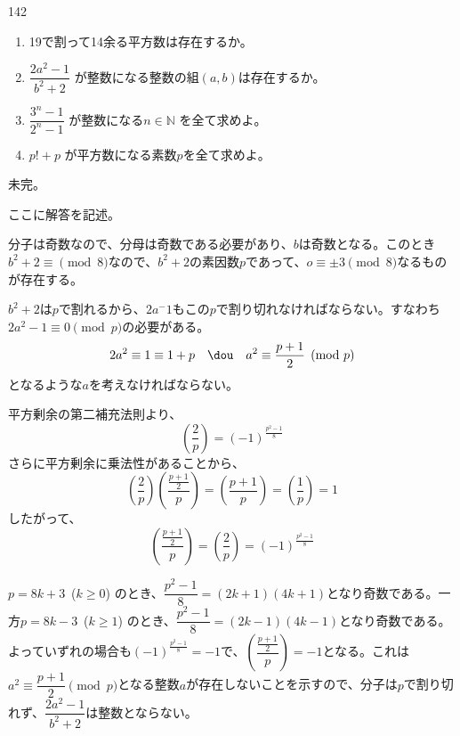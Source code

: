 \begin{thm}{142}{}{}
 \begin{enumerate}
  \item 19で割って14余る平方数は存在するか。 
  \item $\dfrac{2a^2-1}{b^2+2}$ が整数になる整数の組$(a,b)$は存在するか。 
  \item $\dfrac{3^n-1}{2^n-1}$ が整数になる$n\in\mathbb{N}$ を全て求めよ。 
  \item $p!+p$ が平方数になる素数$p$を全て求めよ。 
 \end{enumerate}
\end{thm}

未完。

ここに解答を記述。

分子は奇数なので、分母は奇数である必要があり、$b$は奇数となる。このとき$b^2+2\equiv\pmod{8}$なので、$b^2+2$の素因数$p$であって、$o\equiv\pm 3 \pmod{8}$なるものが存在する。

$b^2+2$は$p$で割れるから、$2a^-1$もこの$p$で割り切れなければならない。すなわち$2a^2-1\equiv 0\pmod{p}$の必要がある。
\[ 2a^2\equiv 1\equiv 1+p \quad\dou\quad a^2\equiv \frac{p+1}{2} \pmod{p} \]
となるような$a$を考えなければならない。

平方剰余の第二補充法則より、
\[ \left(\frac{2}{p}\right)=\left(-1\right)^{\frac{p^2-1}{8}} \]
さらに平方剰余に乗法性があることから、
\[ \left(\frac{2}{p}\right)\left(\frac{\frac{p+1}{2}}{p}\right)=\left(\frac{p+1}{p}\right)=\left(\frac{1}{p}\right)=1 \]
したがって、
\[ \left(\frac{\frac{p+1}{2}}{p}\right)=\left(\frac{2}{p}\right)=\left(-1\right)^{\frac{p^2-1}{8}} \]

$p=8k+3$~($k\ge 0$) のとき、$\dfrac{p^2-1}{8}=(2k+1)(4k+1)$となり奇数である。一方$p=8k-3$~($k\ge 1$) のとき、$\dfrac{p^2-1}{8}=(2k-1)(4k-1)$となり奇数である。よっていずれの場合も$\left(-1\right)^\frac{p^2-1}{8}=-1$で、$\left(\dfrac{\frac{p+1}{2}}{p}\right)=-1$となる。これは$a^2\equiv \dfrac{p+1}{2} \pmod{p}$となる整数$a$が存在しないことを示すので、分子は$p$で割り切れず、$\dfrac{2a^2-1}{b^2+2}$は整数とならない。

